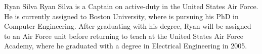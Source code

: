 \documentclass[11pt,journal,compsoc, onecolumn]{IEEEtran}
\begin{document}
\begin{IEEEbiography}{Ryan Silva}
	Ryan Silva is a Captain on active-duty in the United States Air Force.
	He is currently assigned to Boston University, where is pursuing his
	PhD in Computer Engineering. After graduating with his degree, Ryan
	will be assigned to an Air Force unit before returning to teach at the
	United States Air Force Academy, where he graduated with a degree in
	Electrical Engineering in 2005.
\end{IEEEbiography}
\end{document}
